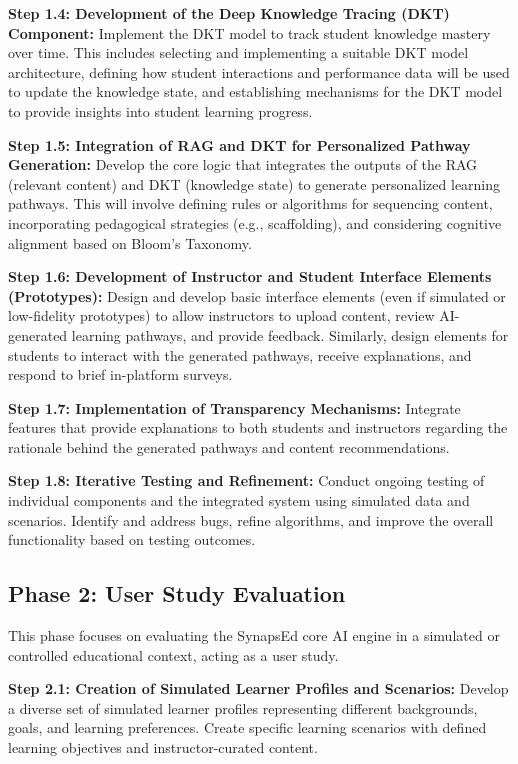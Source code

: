 \documentclass{stylefiles/capstone}
\begin{document}
\textbf{Step 1.4: Development of the Deep Knowledge Tracing (DKT) Component:}  
Implement the DKT model to track student knowledge mastery over time. This includes selecting and implementing a suitable DKT model architecture, defining how student interactions and performance data will be used to update the knowledge state, and establishing mechanisms for the DKT model to provide insights into student learning progress.

\textbf{Step 1.5: Integration of RAG and DKT for Personalized Pathway Generation:}  
Develop the core logic that integrates the outputs of the RAG (relevant content) and DKT (knowledge state) to generate personalized learning pathways. This will involve defining rules or algorithms for sequencing content, incorporating pedagogical strategies (e.g., scaffolding), and considering cognitive alignment based on Bloom's Taxonomy.

\textbf{Step 1.6: Development of Instructor and Student Interface Elements (Prototypes):}  
Design and develop basic interface elements (even if simulated or low-fidelity prototypes) to allow instructors to upload content, review AI-generated learning pathways, and provide feedback. Similarly, design elements for students to interact with the generated pathways, receive explanations, and respond to brief in-platform surveys.

\textbf{Step 1.7: Implementation of Transparency Mechanisms:}  
Integrate features that provide explanations to both students and instructors regarding the rationale behind the generated pathways and content recommendations.

\textbf{Step 1.8: Iterative Testing and Refinement:}  
Conduct ongoing testing of individual components and the integrated system using simulated data and scenarios. Identify and address bugs, refine algorithms, and improve the overall functionality based on testing outcomes.

\subsection{Phase 2: User Study Evaluation}

This phase focuses on evaluating the SynapsEd core AI engine in a simulated or controlled educational context, acting as a user study.

\textbf{Step 2.1: Creation of Simulated Learner Profiles and Scenarios:}  
Develop a diverse set of simulated learner profiles representing different backgrounds, goals, and learning preferences. Create specific learning scenarios with defined learning objectives and instructor-curated content.
\end{document}
